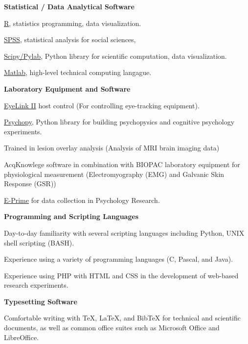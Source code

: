 \documentclass[10pt]{article}
\newenvironment{innerlist}[1][\enskip\textbullet]%
        {\begin{compactenum}[#1]}{\end{compactenum}}
\begin{document}
\begin{outerlist}
\itemsep1pt\parskip0pt
\item
  \textbf{Statistical / Data Analytical Software}

 \begin{innerlist}
  \itemsep1pt\parskip0pt
  \item
    \href{http://www.r-project.org/}{R}, statistics programming, data
    visualization.
  \item
    \href{http://www.spss.com/}{SPSS}, statistical analysis for social
    sciences,
  \item
    \href{http://www.scipy.org/}{Scipy/Pylab}, Python library for
    scientific computation, data visualization.
  \item
    \href{https://www.mathworks.com/products/matlab/}{Matlab},
    high-level technical computing langague.
 \end{innerlist}
\item
  \textbf{Laboratory Equipment and Software}

 \begin{innerlist}
  \itemsep1pt\parskip0pt
  \item
    \href{www.sr-research.com}{EyeLink II} host control (For controlling
    eye-tracking equipment).
  \item
    \href{http://www.psychopy.org/}{Psychopy}, Python library for
    building psychopysics and cognitive psychology experiments.
  \item
    Trained in lesion overlay analysis (Analysis of MRI brain imaging
    data)
  \item
    AcqKnowlege software in combination with BIOPAC laboratory equipment
    for physiological measurement (Electromyography (EMG) and Galvanic
    Skin Response (GSR))
  \item
    \href{http://www.pstnet.com/products/e-prime/}{E-Prime} for data
    collection in Psychology Research.
 \end{innerlist}
\item
  \textbf{Programming and Scripting Languages}

 \begin{innerlist}
  \itemsep1pt\parskip0pt
  \item
    Day-to-day familiarity with several scripting languages including
    Python, UNIX shell scripting (BASH).
  \item
    Experience using a variety of programming languages (C, Pascal, and
    Java).
  \item
    Experience using PHP with HTML and CSS in the development of
    web-based research experiments.
 \end{innerlist}
\item
  \textbf{Typesetting Software}

 \begin{innerlist}
  \itemsep1pt\parskip0pt
  \item
    Comfortable writing with TeX, LaTeX, and BibTeX for technical and
    scientific documents, as well as common office suites such as
    Microsoft Office and LibreOffice.
 \end{innerlist}
\end{outerlist}
\end{document}
